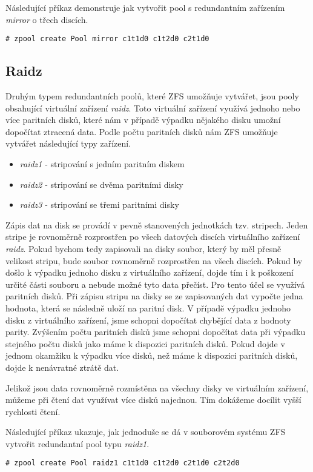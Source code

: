 Následující příkaz demonstruje jak vytvořit pool s redundantním zařízením \emph{mirror} o třech discích.
\begin{verbatim}
# zpool create Pool mirror c1t1d0 c1t2d0 c2t1d0
\end{verbatim}

\subsection{Raidz}
Druhým typem redundantních poolů, které ZFS umožňuje vytvářet, jsou pooly obsahující virtuální zařízení \emph{raidz}. Toto virtuální zařízení využívá jednoho nebo více paritních disků, které nám v případě výpadku nějakého disku umožní dopočítat ztracená data. Podle počtu paritních disků nám ZFS umožňuje vytvářet následující typy zařízení.
\begin{itemize}
  \item \emph{raidz1} - stripování s jedním paritním diskem
  \item \emph{raidz2} - stripování se dvěma paritními disky
  \item \emph{raidz3} - stripování se třemi paritními disky
\end{itemize}

Zápis dat na disk se provádí v pevně stanovených jednotkách tzv. stripech. Jeden stripe je rovnoměrně rozprostřen po všech datových discích virtuálního zařízení \emph{raidz}. Pokud bychom tedy zapisovali na disky soubor, který by měl přesně velikost stripu, bude soubor rovnoměrně rozprostřen na všech discích. Pokud by došlo k výpadku jednoho disku z virtuálního zařízení, dojde tím i k poškození určité části souboru a nebude možné tyto data přečíst. Pro tento účel se využívá paritních disků. Při zápisu stripu na disky se ze zapisovaných dat vypočte jedna hodnota, která se následně uloží na paritní disk. V případě výpadku jednoho disku z virtuálního zařízení, jsme schopni dopočítat chybějící data z hodnoty parity. Zvýšením počtu paritních disků jsme schopni dopočítat data při výpadku stejného počtu disků jako máme k dispozici paritních disků.
Pokud dojde v jednom okamžiku k výpadku více disků, než máme k dispozici paritních disků, dojde k nenávratné ztrátě dat.

Jelikož jsou data rovnoměrně rozmístěna na všechny disky ve virtuálním zařízení, můžeme při čtení dat využívat více disků najednou. Tím dokážeme docílit vyšší rychlosti čtení.

Následující příkaz ukazuje, jak jednoduše se dá v souborovém systému ZFS vytvořit redundantní pool typu \emph{raidz1}.
\begin{verbatim}
# zpool create Pool raidz1 c1t1d0 c1t2d0 c2t1d0 c2t2d0
\end{verbatim}


